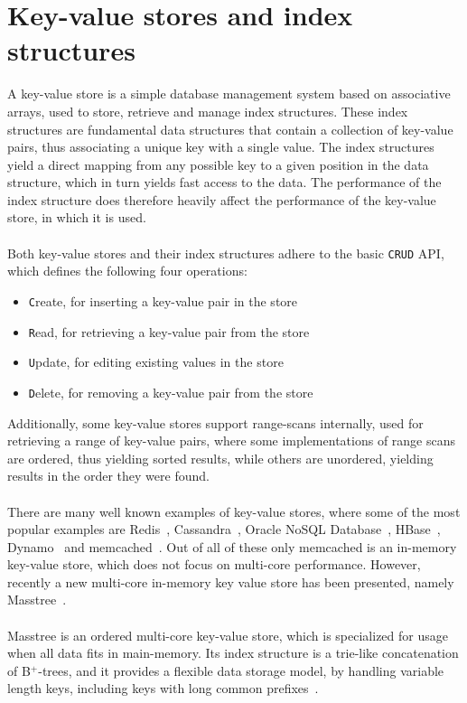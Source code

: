 \documentclass[11pt]{report} %
\begin{document}
\section{Key-value stores and index structures}
\label{sec:background_key_value_store}
A key-value store is a simple database management system based on associative arrays, used to store, retrieve and manage index structures. These index structures are fundamental data structures that contain a collection of key-value pairs, thus associating a unique key with a single value. The index structures yield a direct mapping from any possible key to a given position in the data structure, which in turn yields fast access to the data. The performance of the index structure does therefore heavily affect the performance of the key-value store, in which it is used.\\
\\
Both key-value stores and their index structures adhere to the basic \verb|CRUD| API, which defines the following four operations:
\begin{itemize}
  \item \verb|C|reate, for inserting a key-value pair in the store
  \item \verb|R|ead, for retrieving a key-value pair from the store
  \item \verb|U|pdate, for editing existing values in the store
  \item \verb|D|elete, for removing a key-value pair from the store
\end{itemize}
\noindent
Additionally, some key-value stores support range-scans internally, used for retrieving a range of key-value pairs, where some implementations of range scans are ordered, thus yielding sorted results, while others are unordered, yielding results in the order they were found.\\
\\
There are many well known examples of key-value stores, where some of the most popular examples are Redis~\cite{redis}, Cassandra~\cite{cassandra}, Oracle NoSQL Database~\cite{oracle}, HBase~\cite{hbase}, Dynamo~\cite{dynamo} and memcached~\cite{memcached}. Out of all of these only memcached is an in-memory key-value store, which does not focus on multi-core performance. However, recently a new multi-core in-memory key value store has been presented, namely Masstree~\cite{MT12}. \\
\\
Masstree is an ordered multi-core key-value store, which is specialized for usage when all data fits in main-memory. Its index structure is a trie-like concatenation of B$^+$-trees, and it provides a flexible data storage model, by handling variable length keys, including keys with long common prefixes~\cite{MT12}. \\
\end{document}
